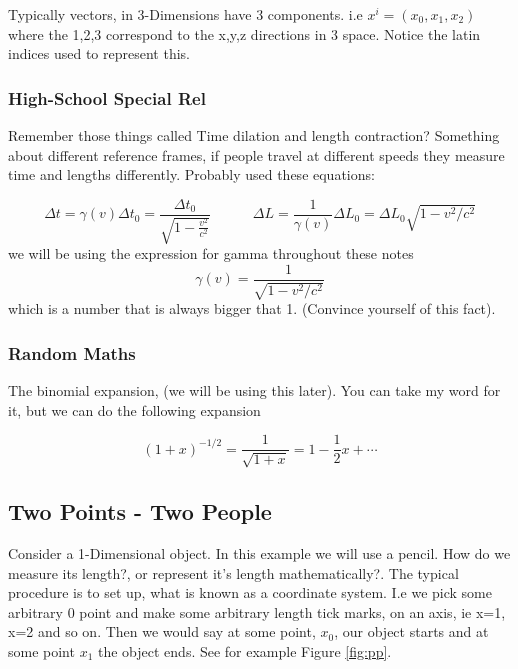 Typically vectors, in 3-Dimensions have 3 components. i.e $x^i = (x_0 , x_1, x_2)$ where the 1,2,3 correspond to the x,y,z directions in 3 space. Notice the latin indices used to represent this. 

\subsubsection{High-School Special Rel}

Remember those things called Time dilation and length contraction? Something about different reference frames, if people travel at different speeds they measure time and lengths differently. Probably used these equations:

\begin{equation}
  \Delta t = \gamma(v) \Delta t_0 = \frac{\Delta t_0}{\sqrt{1 - \frac{v^2}{c^2}}}  \quad \quad \quad \Delta L = \frac{1}{\gamma(v)} \Delta L_0 =\Delta L_0 \sqrt{1 - v^2/c^2} 
  \label{eq:specialrel}
\end{equation}
we will be using the expression for gamma throughout these notes
\begin{equation}
  \gamma(v) = \frac{1}{\sqrt{1 - v^2/c^2}}
\end{equation}
which is a number that is always bigger that 1. (Convince yourself of this fact). 


\subsubsection{Random Maths}
The binomial expansion, (we will be using this later). You can take my word for it, but we can do the following expansion

\begin{equation}
  (1 + x)^{-1/2} = \frac{1}{\sqrt{1 +x}} = 1 - \frac{1}{2}x + \cdots
  \label{eq:binom}
\end{equation}



\subsection{Two Points - Two People}

Consider a 1-Dimensional object. In this example we will use a pencil. How do we measure its length?, or represent it's length mathematically?. The typical procedure is to set up, what is known as a coordinate system. I.e we pick some arbitrary 0 point and make some arbitrary length tick marks, on an axis, ie x=1, x=2 and so on. Then we would say at some point, $x_0$, our object starts and at some point $x_1$ the object ends. See for example Figure \ref{fig:pp}. 

